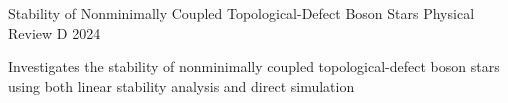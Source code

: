 \begin{cventries}
    \cventrythree
    {Stability of Nonminimally Coupled Topological-Defect Boson Stars} %
    {} %
    {Physical Review D} %
    {2024} %
    {\begin{cvitems} %
        \item Investigates the stability of nonminimally coupled topological-defect boson stars using both linear stability analysis and direct simulation
    \end{cvitems}}
    

\end{cventries}
